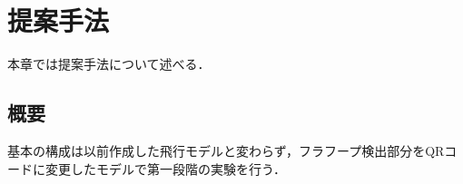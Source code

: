 \chapter{提案手法}
\label{proposed}

本章では提案手法について述べる．

\section{概要}
基本の構成は以前作成した飛行モデルと変わらず，フラフープ検出部分をQRコードに変更したモデルで第一段階の実験を行う．



